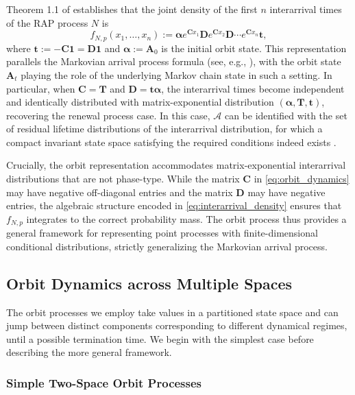 \documentclass[a4paper,11pt]{article}
\numberwithin{equation}{section}
\theoremstyle{plain}
\theoremstyle{definition}
\newcommand{\1}{\mathbf{1}}
\begin{document}
Theorem 1.1 of \cite{AsmussenBladt1999} establishes that the joint density of the first $n$ interarrival times of the RAP process $N$ is
\begin{equation}\label{eq:interarrival_density}
f_{N,p}(x_1, \ldots, x_n) := \bm{\alpha} e^{\bm{C}x_1} \bm{D} e^{\bm{C}x_2} \bm{D} \cdots e^{\bm{C}x_n} \bm{t},
\end{equation}
where $\bm{t} := -\bm{C}\bm{1}=\bm{D}\bm{1}$ and $\bm{\alpha} := \bm{A}_0$ is the initial orbit state.
This representation parallels the Markovian arrival process formula (see, e.g., \cite[Theorem 10.2.3]{BladtNielsen2017}), with the orbit state $\bm{A}_t$ playing the role of the underlying Markov chain state in such a setting.
In particular, when $\bm{C} = \bm{T}$ and $\bm{D} = \bm{t}\bm{\alpha}$, the interarrival times become independent and identically distributed with matrix-exponential distribution $(\bm{\alpha}, \bm{T}, \bm{t})$, recovering the renewal process case.
In this case, $\mathcal{A}$ can be identified with the set of residual lifetime distributions of the interarrival distribution, for which a compact invariant state space satisfying the required conditions indeed exists \cite{AsmussenBladt1999}.

Crucially, the orbit representation accommodates matrix-exponential interarrival distributions that are not phase-type. While the matrix $\bm{C}$ in \eqref{eq:orbit_dynamics} may have negative off-diagonal entries and the matrix $\bm{D}$ may have negative entries, the algebraic structure encoded in \eqref{eq:interarrival_density} ensures that $f_{N,p}$ integrates to the correct probability mass. The orbit process thus provides a general framework for representing point processes with finite-dimensional conditional distributions, strictly generalizing the Markovian arrival process.

\subsection{Orbit Dynamics across Multiple Spaces}

The orbit processes we employ take values in a partitioned state space and can jump between distinct components corresponding to different dynamical regimes, until a possible termination time. We begin with the simplest case before describing the more general framework.


\subsubsection{Simple Two-Space Orbit Processes}\label{subsubsectionTwoSpaceOrbit}
\end{document}
